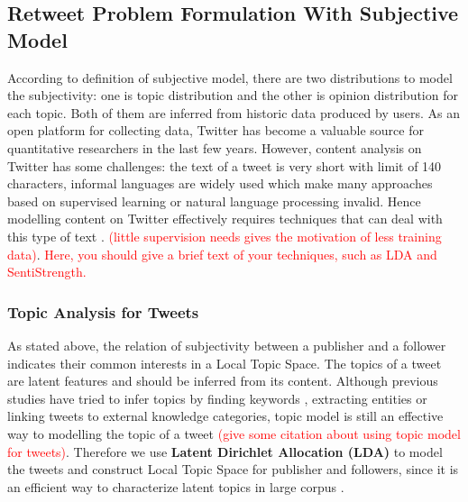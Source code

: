\documentclass{acm_proc_article-sp}
\newcommand{\mo}[1]{\textcolor{red}{#1}}
\begin{document}
\subsection{Retweet Problem Formulation With Subjective Model}
\label{concrete}
According to definition of subjective model, there are two distributions to model the subjectivity: one is topic distribution and the other is opinion distribution for each topic. Both of them are inferred from historic data produced by users.
As an open platform for collecting data, Twitter has become a valuable source for quantitative researchers in the last few years.
However, content analysis on Twitter has some challenges: the text of a tweet is very short with limit of 140 characters, informal languages are widely used which make many approaches based on supervised learning or natural language processing invalid. 
Hence modelling content on Twitter effectively requires techniques that can deal with this type of text .  \mo{ (little supervision needs gives the motivation of less training data)}.  \mo{Here, you should give a brief text of your techniques, such as LDA and SentiStrength.}
\subsubsection{Topic Analysis for Tweets}
\label{local}
As stated above, the relation of subjectivity between a publisher and a follower indicates their common interests in a Local Topic Space. 
The topics of a tweet are latent features and should be inferred from its content.
Although previous studies have tried to infer topics by finding keywords \cite{Chen:2010STE}, extracting  entities \cite{Abel:2011AUM} or linking tweets to external knowledge categories\cite{conf/icwsm/MacskassyM11},  topic model is still an effective way to modelling the topic of a tweet \mo{(give some citation about using topic model for tweets)}. Therefore we use \textbf{Latent Dirichlet Allocation (LDA)} to model the tweets and construct Local Topic Space for publisher and followers, since it is an efficient way to characterize latent topics in large corpus \cite{blei2003latent,conf/wsdm/WengLJH10}. 
\end{document}
